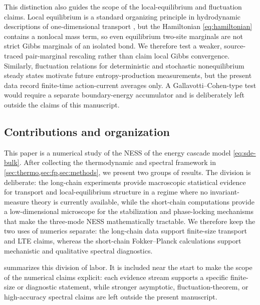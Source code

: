 \documentclass[11pt,a4paper]{article}
\theoremstyle{definition}
\numberwithin{equation}{section}   %
\begin{document}
This distinction also guides the scope of the local-equilibrium and fluctuation
claims. Local equilibrium is a standard organizing principle in hydrodynamic
descriptions of one-dimensional transport \cite{Spohn2014}, but the Hamiltonian
\eqref{eq:hamiltonian} contains a nonlocal mass term, so even equilibrium
two-site marginals are not strict Gibbs marginals of an isolated bond. We
therefore test a weaker, source-traced pair-marginal rescaling rather than claim
local Gibbs convergence. Similarly, fluctuation relations for deterministic and
stochastic nonequilibrium steady states
\cite{GallavottiCohen,LebowitzSpohn1999} motivate future entropy-production
measurements, but the present data record finite-time action-current averages
only. A Gallavotti--Cohen-type test would require a separate boundary-energy
accumulator and is deliberately left outside the claims of this manuscript.

\subsection{Contributions and organization}\label{sec:contributions}

This paper is a numerical study of the NESS of the energy cascade model
\eqref{eq:sde-bulk}. After collecting the thermodynamic and spectral framework in
\cref{sec:thermo,sec:fp,sec:methods}, we present two groups of results.
The division is deliberate: the long-chain experiments provide macroscopic
statistical evidence for transport and local-equilibrium structure in a regime
where no invariant-measure theory is currently available, while the short-chain
computations provide a low-dimensional microscope for the stabilization and
phase-locking mechanisms that make the three-mode NESS mathematically
tractable. We therefore keep the two uses of numerics separate: the long-chain
data support finite-size transport and LTE claims, whereas the short-chain
Fokker--Planck calculations support mechanistic and qualitative spectral
diagnostics.

 summarizes this division of labor. It is included
near the start to make the scope of the numerical claims explicit: each
evidence stream supports a specific finite-size or diagnostic statement, while
stronger asymptotic, fluctuation-theorem, or high-accuracy spectral claims are
left outside the present manuscript.
\end{document}
